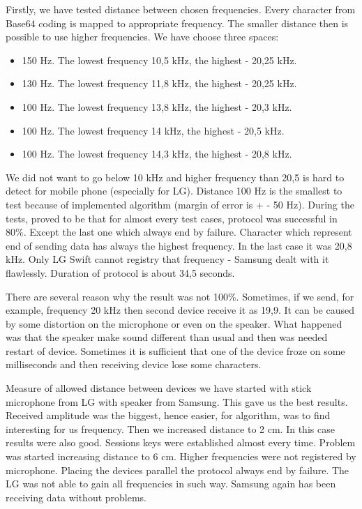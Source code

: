 \documentclass[11pt,titlepage]{article}
\theoremstyle{plain}
\begin{document}
Firstly, we have tested distance between chosen frequencies. Every character from Base64 coding is mapped to appropriate frequency. The smaller distance then is possible to use higher frequencies. We have choose three spaces:
\begin{itemize}
\item 150 Hz. The lowest frequency 10,5 kHz, the highest - 20,25 kHz.
\item 130 Hz. The lowest frequency 11,8 kHz, the highest - 20,25 kHz.
\item 100 Hz. The lowest frequency 13,8 kHz, the highest - 20,3 kHz.
\item 100 Hz. The lowest frequency 14 kHz, the highest - 20,5 kHz.
\item 100 Hz. The lowest frequency 14,3 kHz, the highest - 20,8 kHz.
\end{itemize}
We did not want to go below 10 kHz and higher frequency than 20,5 is hard to detect for mobile phone (especially for LG). Distance 100 Hz is the smallest to test because of implemented algorithm (margin of error is + - 50 Hz). During the tests, proved to be that for almost every test cases, protocol was successful in 80\%. Except the last one which always end by failure. Character which represent end of sending data has always the highest frequency. In the last case it was 20,8 kHz. Only LG Swift cannot registry that frequency - Samsung dealt with it flawlessly. Duration of protocol is about 34,5 seconds.

\vspace{5mm}

There are several reason why the result was not 100\%. Sometimes, if we send, for example, frequency 20 kHz then second device receive it as 19,9. It can be caused by some distortion on the microphone or even on the speaker. What happened was that the speaker make sound different than usual and then was needed restart of device. Sometimes it is sufficient that one of the device froze on some milliseconds and then receiving device lose some characters. 

\vspace{5mm}

Measure of allowed distance between devices we have started with stick microphone from LG with speaker from Samsung. This gave us the best results. Received amplitude was the biggest, hence easier, for algorithm, was to find interesting for us frequency. Then we increased distance to 2 cm. In this case results were also good. Sessions keys were established almost every time. Problem was started increasing distance to 6 cm. Higher frequencies were not registered by microphone. Placing the devices parallel the protocol always end by failure. The LG was not able to gain all frequencies in such way. Samsung again has been receiving data without problems. 
\end{document}
